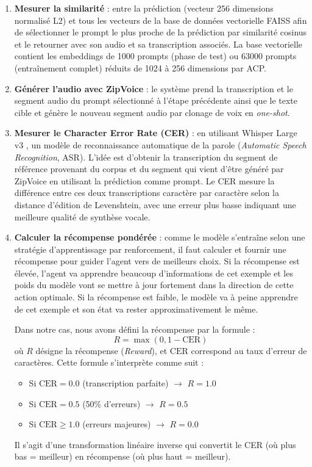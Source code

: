 \begin{enumerate}
    \item \textbf{Mesurer la similarité} : entre la prédiction (vecteur 256 dimensions normalisé L2) et tous les vecteurs de la base de données vectorielle FAISS afin de sélectionner le prompt le plus proche de la prédiction par similarité cosinus et le retourner avec son audio et sa transcription associés. La base vectorielle contient les embeddings de 1000 prompts (phase de test) ou 63000 prompts (entraînement complet) réduits de 1024 à 256 dimensions par ACP.

    \item \textbf{Générer l'audio avec ZipVoice} : le système prend la transcription et le segment audio du prompt sélectionné à l'étape précédente ainsi que le texte cible et génère le nouveau segment audio par clonage de voix en \textit{one-shot}.

    \item \textbf{Mesurer le Character Error Rate (CER)} : en utilisant Whisper Large v3 \cite{whisper}, un modèle de reconnaissance automatique de la parole (\textit{Automatic Speech Recognition}, ASR). L'idée est d'obtenir la transcription du segment de référence provenant du corpus et du segment qui vient d'être généré par ZipVoice en utilisant la prédiction comme prompt. Le CER mesure la différence entre ces deux transcriptions caractère par caractère selon la distance d'édition de Levenshtein, avec une erreur plus basse indiquant une meilleure qualité de synthèse vocale.

    \item \textbf{Calculer la récompense pondérée} : comme le modèle s'entraîne selon une stratégie d'apprentissage par renforcement, il faut calculer et fournir une récompense pour guider l'agent vers de meilleurs choix. Si la récompense est élevée, l'agent va apprendre beaucoup d'informations de cet exemple et les poids du modèle vont se mettre à jour fortement dans la direction de cette action optimale. Si la récompense est faible, le modèle va à peine apprendre de cet exemple et son état va rester approximativement le même. 
    
    Dans notre cas, nous avons défini la récompense par la formule : 
    \[
    R = \max(0, 1 - \mathrm{CER})
    \]
    où $R$ désigne la récompense (\textit{Reward}), et $\mathrm{CER}$ correspond au taux d'erreur de caractères. Cette formule s'interprète comme suit :
    \begin{itemize}
      \item Si $\mathrm{CER} = 0.0$ (transcription parfaite) $\rightarrow$ $R = 1.0$
      \item Si $\mathrm{CER} = 0.5$ (50\% d'erreurs) $\rightarrow$ $R = 0.5$
      \item Si $\mathrm{CER} \geq 1.0$ (erreurs majeures) $\rightarrow$ $R = 0.0$
    \end{itemize}
    Il s'agit d'une transformation linéaire inverse qui convertit le CER (où plus bas = meilleur) en récompense (où plus haut = meilleur).


\end{enumerate}
